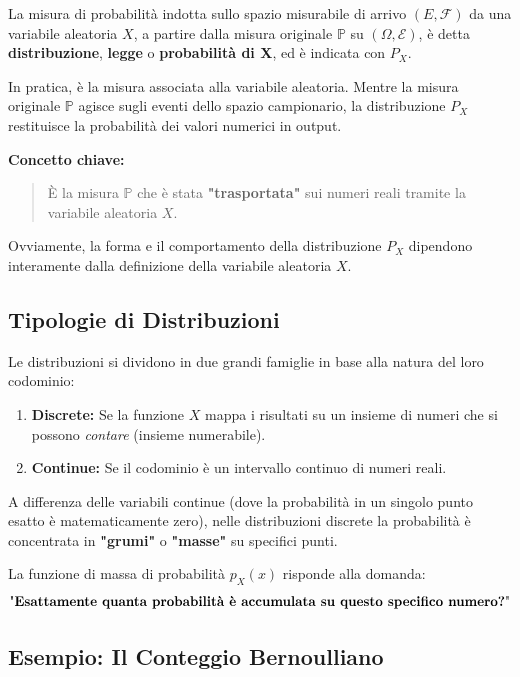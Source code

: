 La misura di probabilità indotta sullo spazio misurabile di arrivo $(E, \mathcal{F})$ da una variabile aleatoria $X$, a partire dalla misura originale $\mathbb{P}$ su $(\Omega, \mathcal{E})$, è detta \textbf{distribuzione}, \textbf{legge} o \textbf{probabilità di X}, ed è indicata con $P_X$.

In pratica, è la misura associata alla variabile aleatoria. Mentre la misura originale $\mathbb{P}$ agisce sugli eventi dello spazio campionario, la distribuzione $P_X$ restituisce la probabilità dei valori numerici in output.

\textbf{Concetto chiave:}
\begin{quote}
    È la misura $\mathbb{P}$ che è stata \textbf{"trasportata"} sui numeri reali tramite la variabile aleatoria $X$.
\end{quote}


Ovviamente, la forma e il comportamento della distribuzione $P_X$ dipendono interamente dalla definizione della variabile aleatoria $X$.

\subsection{Tipologie di Distribuzioni}

Le distribuzioni si dividono in due grandi famiglie in base alla natura del loro codominio:

\begin{enumerate}
    \item \textbf{Discrete:} Se la funzione $X$ mappa i risultati su un insieme di numeri che si possono \textit{contare} (insieme numerabile).
    \item \textbf{Continue:} Se il codominio è un intervallo continuo di numeri reali.
\end{enumerate}

A differenza delle variabili continue (dove la probabilità in un singolo punto esatto è matematicamente zero), nelle distribuzioni discrete la probabilità è concentrata in \textbf{"grumi"} o \textbf{"masse"} su specifici punti.

La funzione di massa di probabilità $p_X(x)$ risponde alla domanda:
\[
\text{"\textbf{Esattamente quanta probabilità è accumulata su questo specifico numero?}"}
\]


\subsection{Esempio: Il Conteggio Bernoulliano}

